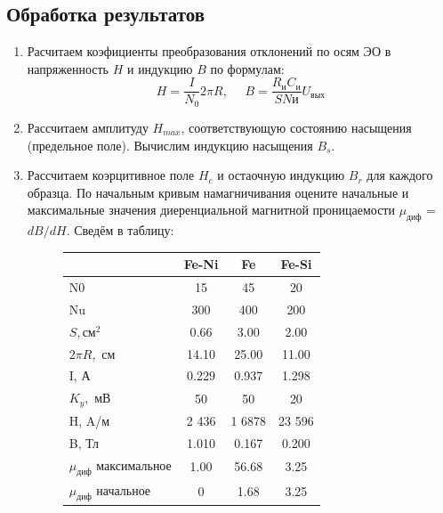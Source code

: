 \documentclass[14pt,a4paper]{article}
\begin{document}
\subsection*{Обработка результатов}
\begin{enumerate}
  \item Расчитаем коэфициенты преобразования отклонений по осям ЭО в напряженность $H$ и индукцию $B$ по формулам:
  $$H = \frac{I}{N_0}{2\pi R}, \ \ \ \ \ \ B = \frac{R_\text{и}C_\text{и}}{SN\text{и}}U_\text{вых}$$
  \item Рассчитаем амплитуду
  $H_{max}$, соответствующую состоянию насыщения (предельное поле). Вычислим индукцию насыщения $B_s$.
  \item Рассчитаем коэрцитивное поле $H_c$ и остаочную индукцию $B_r$ для каждого образца. По начальным кривым намагничивания оцените начальные и максимальные
значения диеренциальной магнитной проницаемости $\mu_\text{диф}$ = $dB/dH$.
  Сведём в таблицу:
  \begin{figure}[H]
    \begin{tabular}{l|ccc}
      {} &        Fe-Ni &            Fe &         Fe-Si \\
      \midrule
      N0  &    15 &     45 &     20 \\
      Nu  &   300 &    400 &    200 \\
      $S, \text{см}^2$   &     0.66 &      3.00 &      2.00 \\
      $2\pi R,$ см &     14.10 &      25.00 &      11.00 \\
      I, А   &     0.229 &      0.937 &      1.298 \\
      $K_y,$ мВ  &     50 &      50 &      20 \\
      H, A/м   &  2 436 &  1 6878 &  23 596 \\
      B, Тл   &     1.010 &      0.167 &      0.200 \\
      $μ_\text{диф}$ максимальное & 1.00 & 56.68& 3.25 \\
      $μ_\text{диф}$ начальное& 0 & 1.68& 3.25 \\
      \end{tabular}
  \end{figure}
\end{enumerate}
\end{document}
